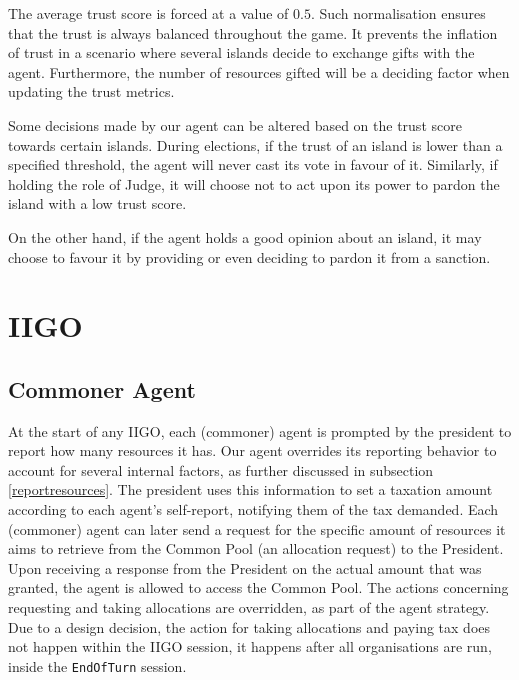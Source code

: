 The average trust score is forced at a value of $0.5$. Such normalisation ensures that the trust is always balanced throughout the game. It prevents the inflation of trust in a scenario where several islands decide to exchange gifts with the agent. Furthermore, the number of resources gifted will be a deciding factor when updating the trust metrics.

Some decisions made by our agent can be altered based on the trust score towards certain islands. During elections, if the trust of an island is lower than a specified threshold, the agent will never cast its vote in favour of it. Similarly, if holding the role of Judge, it will choose not to act upon its power to pardon the island with a low trust score.

On the other hand, if the agent holds a good opinion about an island, it may choose to favour it by providing or even deciding to  pardon it from a sanction.


\section{IIGO}
\subsection{Commoner Agent} \label{commoneragent}
At the start of any IIGO, each (commoner) agent is prompted by the president to report how many resources it has. Our agent overrides its reporting behavior  to account for several internal factors, as further discussed in subsection \ref{reportresources}. The president uses this information to set a taxation amount according to each agent's self-report, notifying them of the tax demanded. Each (commoner) agent can later send a request for the specific amount of resources it aims to retrieve from the Common Pool (an allocation request) to the President. Upon receiving a response from the President on the actual amount that was granted, the agent is allowed to access the Common Pool. The actions concerning requesting and taking allocations are overridden, as part of the agent strategy. Due to a design decision, the action for taking allocations and paying tax does not happen within the IIGO session, it happens after all organisations are run, inside the \texttt{EndOfTurn} session.

